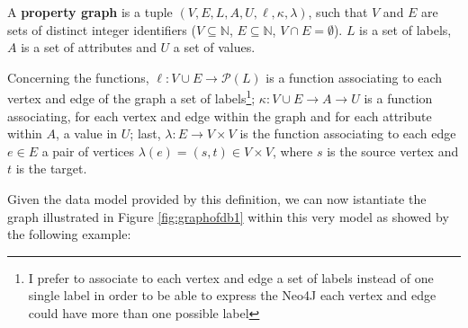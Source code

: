 \begin{definition}\label{def:propg10}
A \textbf{property graph} is a tuple $(V,E,L,A,U,\ell,\kappa,\lambda)$, such that $V$ and $E$ are sets of distinct integer identifiers ($V\subseteq \mathbb{N}$, $E\subseteq \mathbb{N}$, $V\cap E=\emptyset$). $L$ is a set of labels, $A$ is a set of attributes and $U$ a set of values.

Concerning the functions, $\ell\colon V\cup E\to \mathcal{P}(L)$ is a function associating to each vertex and edge of the graph a set of labels\footnote{I prefer to associate to each vertex and edge a set of labels instead of one single label in order to be able to express the Neo4J \cite{Neo4jMan,Neo4jAlg} each vertex and edge could have more than one possible label}; $\kappa\colon V\cup E\to A\to U$   is a function associating, for each vertex and edge within the graph and for each attribute within $A$, a value in $U$; last, $\lambda\colon E\to V\times V$ is the function associating to each edge $e\in E$ a pair of vertices $\lambda(e)=(s,t)\in V\times V$, where $s$ is the source vertex and $t$ is the target. 
\end{definition}

Given the data model provided by this definition, we can now istantiate 
the graph illustrated in Figure \ref{fig:graphofdb1} within this very model as showed by the following example:

